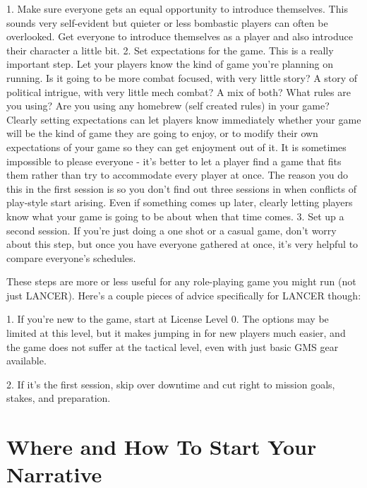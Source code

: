              1.  Make sure everyone gets an equal opportunity to introduce themselves. This  
                 sounds very self-evident but quieter or less bombastic players can often be  
                 overlooked. Get everyone to introduce themselves as a player and also introduce  
                 their character a little bit.  
             2.  Set expectations for the game. This is a really important step. Let your players  
                 know the kind of game you’re planning on running. Is it going to be more combat  
                 focused, with very little story? A story of political intrigue, with very little mech  
                 combat? A mix of both? What rules are you using? Are you using any homebrew  
                 (self created rules) in your game? Clearly setting expectations can let players  
                 know immediately whether your game will be the kind of game they are going to  
                 enjoy, or to modify their own expectations of your game so they can get  
                 enjoyment out of it. It is sometimes impossible to please everyone - it’s better to  
                 let a player find a game that fits them rather than try to accommodate every player  
                 at once. The reason you do this in the first session is so you don’t find out three  
                 sessions in when conflicts of play-style start arising. Even if something comes up  
                 later, clearly letting players know what your game is going to be about when that  
                 time comes.  
             3.  Set up a second session. If you’re just doing a one shot or a casual game, don’t  
                 worry about this step, but once you have everyone gathered at once, it’s very  
                 helpful to compare everyone’s schedules.  

These steps are more or less useful for any role-playing game you might run (not just LANCER).  
Here’s a couple pieces of advice specifically for LANCER though:
 

         	1. If you’re new to the game, start at License Level 0. The options may be limited at this  
         level, but it makes jumping in for new players much easier, and the game does not suffer  
         at the tactical level, even with just basic GMS gear available.
 
         	2. If it’s the first session, skip over downtime and cut right to mission goals, stakes, and  
         preparation.
 
\section{Where and How To Start Your Narrative}

